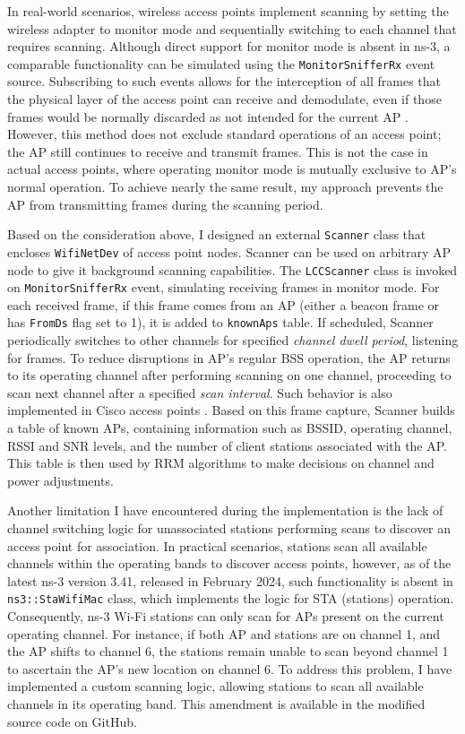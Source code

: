 In real-world scenarios, wireless access points implement scanning by setting the wireless adapter to monitor mode and sequentially switching to each channel that requires scanning. Although direct support for monitor mode is absent in ns-3, a comparable functionality can be simulated using the \texttt{MonitorSnifferRx} event source. Subscribing to such events allows for the interception of all frames that the physical layer of the access point can receive and demodulate, even if those frames would be normally discarded as not intended for the current AP \cite{Ns3AllTraceSources}. However, this method does not exclude standard operations of an access point; the AP still continues to receive and transmit frames. This is not the case in actual access points, where operating monitor mode is mutually exclusive to AP's normal operation. To achieve nearly the same result, my approach prevents the AP from transmitting frames during the scanning period.

Based on the consideration above, I designed an external \texttt{Scanner} class that encloses \texttt{WifiNetDev} of access point nodes. Scanner can be used on arbitrary AP node to give it background scanning capabilities.
The \texttt{LCCScanner} class is invoked on \texttt{MonitorSnifferRx} event, simulating receiving frames in monitor mode. For each received frame, if this frame comes from an AP (either a beacon frame or has \texttt{FromDs} flag set to 1), it is added to \texttt{knownAps} table.
If scheduled, Scanner periodically switches to other channels for specified \textit{channel dwell period}, listening for frames. To reduce disruptions in AP's regular BSS operation, the AP returns to its operating channel after performing scanning on one channel, proceeding to scan next channel after a specified \textit{scan interval}. Such behavior is also implemented in Cisco access points \cite{ciscoRadioResourceManagement}.
Based on this frame capture, Scanner builds a table of known APs, containing information such as BSSID, operating channel, RSSI and SNR levels, and the number of client stations associated with the AP. This table is then used by RRM algorithms to make decisions on channel and power adjustments.

Another limitation I have encountered during the implementation is the lack of channel switching logic for unassociated stations performing scans to discover an access point for association. In practical scenarios, stations scan all available channels within the operating bands to discover access points, however, as of the latest ns-3 version 3.41, released in February 2024, such functionality is absent in \texttt{ns3::StaWifiMac} class, which implements the logic for STA (stations) operation. Consequently, ns-3 Wi-Fi stations can only scan for APs present on the current operating channel. For instance, if both AP and stations are on channel 1, and the AP shifts to channel 6, the stations remain unable to scan beyond channel 1 to ascertain the AP's new location on channel 6. To address this problem, I have implemented a custom scanning logic, allowing stations to scan all available channels in its operating band. This amendment is available in the modified source code on GitHub.


